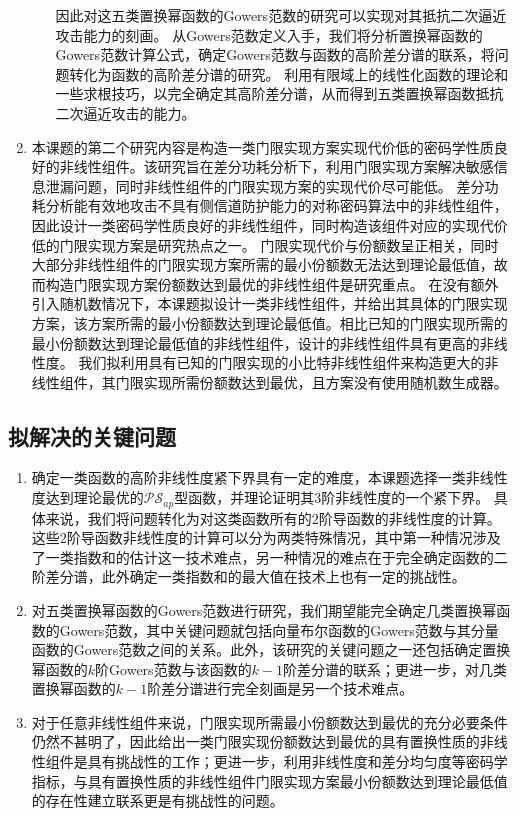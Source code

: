 \documentclass[a4paper,zihao=-4,AutoFakeBold]{ctexart}
\begin{document}
\begin{enumerate}[label=(\arabic{*})]
\begin{enumerate}
        因此对这五类置换幂函数的Gowers范数的研究可以实现对其抵抗二次逼近攻击能力的刻画。
        从Gowers范数定义入手，我们将分析置换幂函数的Gowers范数计算公式，确定Gowers范数与函数的高阶差分谱的联系，将问题转化为函数的高阶差分谱的研究。
        利用有限域上的线性化函数的理论和一些求根技巧，以完全确定其高阶差分谱，从而得到五类置换幂函数抵抗二次逼近攻击的能力。
    \end{enumerate}
    \item 本课题的第二个研究内容是构造一类门限实现方案实现代价低的密码学性质良好的非线性组件。该研究旨在差分功耗分析下，利用门限实现方案解决敏感信息泄漏问题，同时非线性组件的门限实现方案的实现代价尽可能低。
    差分功耗分析能有效地攻击不具有侧信道防护能力的对称密码算法中的非线性组件，因此设计一类密码学性质良好的非线性组件，同时构造该组件对应的实现代价低的门限实现方案是研究热点之一。 
    门限实现代价与份额数呈正相关，同时大部分非线性组件的门限实现方案所需的最小份额数无法达到理论最低值，故而构造门限实现方案份额数达到最优的非线性组件是研究重点。
    在没有额外引入随机数情况下，本课题拟设计一类非线性组件，并给出其具体的门限实现方案，该方案所需的最小份额数达到理论最低值。相比已知的门限实现所需的最小份额数达到理论最低值的非线性组件，设计的非线性组件具有更高的非线性度。
    我们拟利用具有已知的门限实现的小比特非线性组件来构造更大的非线性组件，其门限实现所需份额数达到最优，且方案没有使用随机数生成器。
\end{enumerate}
\subsection{拟解决的关键问题}
\begin{enumerate}[label=(\arabic{*})]
    \item 确定一类函数的高阶非线性度紧下界具有一定的难度，本课题选择一类非线性度达到理论最优的$\mathcal{PS}_{ap}$型函数，并理论证明其$3$阶非线性度的一个紧下界。
    具体来说，我们将问题转化为对这类函数所有的$2$阶导函数的非线性度的计算。这些$2$阶导函数非线性度的计算可以分为两类特殊情况，其中第一种情况涉及了一类指数和的估计这一技术难点，另一种情况的难点在于完全确定函数的二阶差分谱，此外确定一类指数和的最大值在技术上也有一定的挑战性。
    \item 对五类置换幂函数的Gowers范数进行研究，我们期望能完全确定几类置换幂函数的Gowers范数，其中关键问题就包括向量布尔函数的Gowers范数与其分量函数的Gowers范数之间的关系。此外，该研究的关键问题之一还包括确定置换幂函数的$k$阶Gowers范数与该函数的$k-1$阶差分谱的联系；更进一步，对几类置换幂函数的$k-1$阶差分谱进行完全刻画是另一个技术难点。
    \item 对于任意非线性组件来说，门限实现所需最小份额数达到最优的充分必要条件仍然不甚明了，因此给出一类门限实现份额数达到最优的具有置换性质的非线性组件是具有挑战性的工作；更进一步，利用非线性度和差分均匀度等密码学指标，与具有置换性质的非线性组件门限实现方案最小份额数达到理论最低值的存在性建立联系更是有挑战性的问题。
\end{enumerate}
\end{document}

